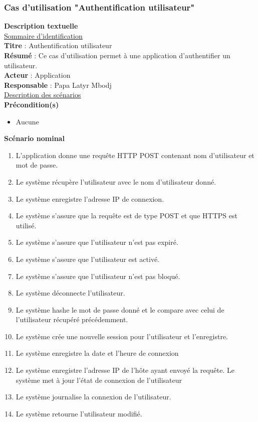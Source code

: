\subsubsection{Cas d'utilisation "Authentification utilisateur"}
\textbf{\RIGHTarrow Description textuelle}\\
\underline{\underline{Sommaire d’identification}} \\
\textbf{Titre} : Authentification utilisateur\\
\textbf{Résumé} : Ce cas d’utilisation permet à une application d'authentifier un utilisateur.\\
\textbf{Acteur} : Application\\	
\textbf{Responsable} : Papa Latyr Mbodj\\
\underline{\underline{Description des scénarios}}\\
\textbf{Précondition(s)}
\begin{itemize}
	\item Aucune
\end{itemize}
\textbf{Scénario nominal}
\begin{enumerate}
	\item L'application donne une requête HTTP POST contenant nom d'utilisateur et mot de passe.
	\item Le système récupère l'utilisateur avec le nom d'utilisateur donné.
	\item Le système enregistre l'adresse IP de connexion.
	\item Le système s'assure que la requête est de type POST et que HTTPS est utilisé.
	\item Le système s'assure que l'utilisateur n'est pas expiré.
	\item Le système s'assure que l'utilisateur est activé.
	\item Le système s'assure que l'utilisateur n'est pas bloqué.
	\item Le système déconnecte l'utilisateur.
	\item Le système hashe le mot de passe donné et le compare avec celui de l'utilisateur récupéré précédemment.
	\item Le système crée une nouvelle session pour l'utilisateur et l'enregistre.
	\item Le système enregistre la date et l'heure de connexion 
	\item Le système enregistre l'adresse IP de l'hôte ayant envoyé la requête.
	Le système met à jour l'état de connexion de l'utilisateur
	\item Le système journalise la connexion de l'utilisateur.
	\item Le système retourne l'utilisateur modifié.
\end{enumerate}
